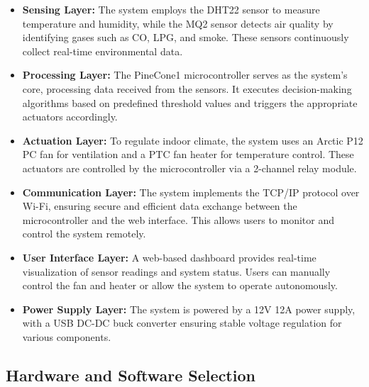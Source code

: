 \documentclass[a4paper]{scrartcl}
\begin{document}
\begin{itemize}
\item \textbf{Sensing Layer:} The system employs the DHT22 sensor to measure temperature and humidity, while the MQ2 sensor detects air quality by identifying gases such as CO, LPG, and smoke. These sensors continuously collect real-time environmental data.
\item \textbf{Processing Layer:} The PineCone1 microcontroller serves as the system's core, processing data received from the sensors. It executes decision-making algorithms based on predefined threshold values and triggers the appropriate actuators accordingly.
\item \textbf{Actuation Layer:} To regulate indoor climate, the system uses an Arctic P12 PC fan for ventilation and a PTC fan heater for temperature control. These actuators are controlled by the microcontroller via a 2-channel relay module.
\item \textbf{Communication Layer:} The system implements the TCP/IP protocol over Wi-Fi, ensuring secure and efficient data exchange between the microcontroller and the web interface. This allows users to monitor and control the system remotely.
\item \textbf{User Interface Layer:} A web-based dashboard provides real-time visualization of sensor readings and system status. Users can manually control the fan and heater or allow the system to operate autonomously.
\item \textbf{Power Supply Layer:} The system is powered by a 12V 12A power supply, with a USB DC-DC buck converter ensuring stable voltage regulation for various components.
\end{itemize}

\subsection{Hardware and Software Selection}
\end{document}
